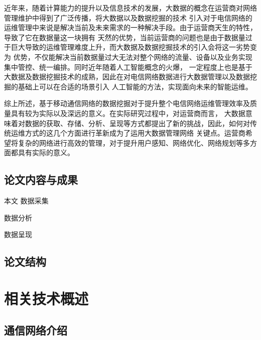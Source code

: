 \documentclass{HustGraduPaper}
\begin{document}
    近年来，随着计算能力的提升以及信息技术的发展，大数据的概念在运营商对网络管理维护中得到了广泛传播，将大数据以及数据挖掘的技术
    引入对于电信网络的运维管理中来说是解决当前及未来需求的一种解决手段。由于运营商天生的特性，导致了它在数据量这一块拥有
    天然的优势，当前运营商的问题也是由于数据量过于巨大导致的运维管理难度上升，而大数据及数据挖掘技术的引入会将这一劣势变为
    优势，不仅能解决当前数据量过大无法对整个网络的流量、设备以及业务实现集中管控、统一编排。同时近年随着人工智能概念的火爆，
    一定程度上也是基于大数据及数据挖掘技术的成熟，因此在对电信网络数据进行大数据管理以及数据挖掘的基础上可以在合适的场景引入
    人工智能的方法，实现面向未来的智能运维。
    
    综上所述，基于移动通信网络的数据挖掘对于提升整个电信网络运维管理效率及质量具有较为实际以及深远的意义。在实际研究过程中，对运营商而言，
    大数据意味着对数据的获取、存储、分析、呈现等方式都提出了新的挑战，因此，如何对传统运维方式的这几个方面进行革新成为了运用大数据管理网络
    关键点。运营商希望将复杂的网络进行高效的管理，对于提升用户感知、网络优化、网络规划等多方面都具有实际的意义。

    \subsection{论文内容与成果}

    本文
    数据采集

    数据分析

    数据呈现

    \subsection{论文结构}
    \clearpage
    \section{相关技术概述}
    \subsection{通信网络介绍}



    
    
\end{document}
